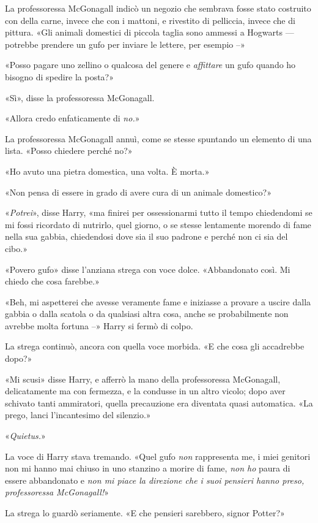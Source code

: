 La professoressa McGonagall indicò un negozio che sembrava fosse stato costruito con della carne, invece che con i mattoni, e rivestito di pelliccia, invece che di pittura. «Gli animali domestici di piccola taglia sono ammessi a Hogwarts — potrebbe prendere un gufo per inviare le lettere, per esempio –»

«Posso pagare uno zellino o qualcosa del genere e \textit{affittare} un gufo quando ho bisogno di spedire la posta?»

«Sì», disse la professoressa McGonagall.

«Allora credo enfaticamente di \textit{no.}»

La professoressa McGonagall annuì, come se stesse spuntando un elemento di una lista. «Posso chiedere perché no?»

«Ho avuto una pietra domestica, una volta. È morta.»

«Non pensa di essere in grado di avere cura di un animale domestico?»

«\textit{Potrei}», disse Harry, «ma finirei per ossessionarmi tutto il tempo chiedendomi se mi fossi ricordato di nutrirlo, quel giorno, o se stesse lentamente morendo di fame nella sua gabbia, chiedendosi dove sia il suo padrone e perché non ci sia del cibo.»

«Povero gufo» disse l’anziana strega con voce dolce. «Abbandonato così. Mi chiedo che cosa farebbe.»

«Beh, mi aspetterei che avesse veramente fame e iniziasse a provare a uscire dalla gabbia o dalla scatola o da qualsiasi altra cosa, anche se probabilmente non avrebbe molta fortuna –» Harry si fermò di colpo.

La strega continuò, ancora con quella voce morbida. «E che cosa gli accadrebbe dopo?»

«Mi scusi» disse Harry, e afferrò la mano della professoressa McGonagall, delicatamente ma con fermezza, e la condusse in un altro vicolo; dopo aver schivato tanti ammiratori, quella precauzione era diventata quasi automatica. «La prego, lanci l’incantesimo del silenzio.»

«\textit{Quietus.}»

La voce di Harry stava tremando. «Quel gufo \textit{non} rappresenta me, i miei genitori non mi hanno mai chiuso in uno stanzino a morire di fame, \textit{non ho} paura di essere abbandonato e \textit{non mi piace la direzione che i suoi pensieri hanno preso, professoressa McGonagall!}»

La strega lo guardò seriamente. «E che pensieri sarebbero, signor Potter?»

